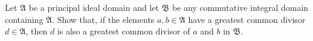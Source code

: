 Let $\mathfrak{A}$ be a principal ideal domain and let $\mathfrak{B}$ be any commutative integral domain containing $\mathfrak{A}$. Show that, if the elements $a, b \in \mathfrak{A}$ have a greatest common divisor $d \in \mathfrak{A}$, then $d$ is also a greatest common divisor of $a$ and $b$ in $\mathfrak{B}$.